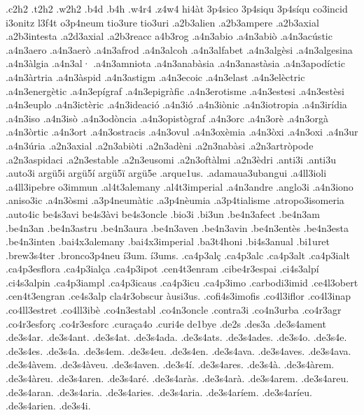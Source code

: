 {%
.c2h2 .t2h2 .w2h2
.b4d .b4h .w4r4 .z4w4
hi4àt
3p4sico 3p4siqu 3p4síqu
co3incid
i3onitz
l3f4t
o3p4neum
tio3ure
tio3uri
.a2b3alien
.a2b3ampere
.a2b3axial
.a2b3intesta
.a2d3axial
.a2b3reacc
a4b3rog
.a4n3abio
.a4n3abiò
.a4n3acústic
.a4n3aero
.a4n3aerò
.a4n3afrod
.a4n3alcoh
.a4n3alfabet
.a4n3algèsi
.a4n3algesina
.a4n3àlgia
.a4n3al·
.a4n3amniota
.a4n3anabàsia
.a4n3anastàsia
.a4n3apodíctic
.a4n3àrtria
.a4n3àspid
.a4n3astigm
.a4n3ecoic
.a4n3elast
.a4n3elèctric
.a4n3energètic
.a4n3epígraf
.a4n3epigràfic
.a4n3erotisme
.a4n3estesi
.a4n3estèsi
.a4n3euplo
.a4n3ictèric
.a4n3ideació
.a4n3ió
.a4n3iònic
.a4n3iotropia
.a4n3irídia
.a4n3iso
.a4n3isò
.a4n3odòncia
.a4n3opistògraf
.a4n3orc
.a4n3orè
.a4n3orgà
.a4n3òrtic
.a4n3ort
.a4n3ostracis
.a4n3ovul
.a4n3oxèmia
.a4n3òxi
.a4n3oxi
.a4n3ur
.a4n3úria
.a2n3axial
.a2n3abiòti
.a2n3adèni
.a2n3nabàsi
.a2n3artròpode
.a2n3aspidaci
.a2n3estable
.a2n3eusomi
.a2n3oftàlmi
.a2n3èdri
.anti3i .anti3u
.auto3i
argü5i
argü5í
argü5ï
argü5e
.arque1us.
.adamaua3ubangui
.a4ll3ioli
.a4ll3ipebre
o3immun
.al4t3alemany
.al4t3imperial
.a4n3andre
.anglo3i
.a4n3iono
.aniso3ic
.a4n3òsmi
.a3p4neumàtic
.a3p4nèumia
.a3p4tialisme
.atropo3isomeria
.auto4ic
be4s3avi
be4s3àvi
be4s3oncle
.bio3i
.bi3un
.be4n3afect
.be4n3am
.be4n3an
.be4n3astru
.be4n3aura
.be4n3aven
.be4n3avin
.be4n3entès
.be4n3esta
.be4n3inten
.bai4x3alemany
.bai4x3imperial
.ba3t4honi
.bi4s3anual
.bi1uret
.brew3s4ter
.bronco3p4neu
í3um.
í3ums.
.ca4p3alç
.ca4p3alc
.ca4p3alt
.ca4p3ialt
.ca4p3esflora
.ca4p3ialça
.ca4p3ipot
.cen4t3enram
.cibe4r3espai
.ci4s3alpí
.ci4s3alpin
.ca4p3iampl
.ca4p3icaus
.ca4p3icu
.ca4p3imo
.carbodi3imid
.ce4l3obert
.cen4t3engran
.ce4s3alp
cla4r3obscur
àusi3us.
.cofi4s3imofis
.co4l3iflor
.co4l3inap
.co4ll3estret
.co4ll3ibè
.co4n3establ
.co4n3oncle
.contra3i
.co4n3urba
.co4r3agr
.co4r3esforç
.co4r3esforc
.curaça4o
.curi4e
de1bye
.de2s
.des3a
.de3s4ament
.de3s4ar.
.de3s4ant.
.de3s4at.
.de3s4ada.
.de3s4ats.
.de3s4ades.
.de3s4o.
.de3s4e.
.de3s4es.
.de3s4a.
.de3s4em.
.de3s4eu.
.de3s4en.
.de3s4ava.
.de3s4aves.
.de3s4ava.
.de3s4àvem.
.de3s4àveu.
.de3s4aven.
.de3s4í.
.de3s4ares.
.de3s4à.
.de3s4àrem.
.de3s4àreu.
.de3s4aren.
.de3s4aré.
.de3s4aràs.
.de3s4arà.
.de3s4arem.
.de3s4areu.
.de3s4aran.
.de3s4aria.
.de3s4aries.
.de3s4aria.
.de3s4aríem.
.de3s4aríeu.
.de3s4arien.
.de3s4i.
}
